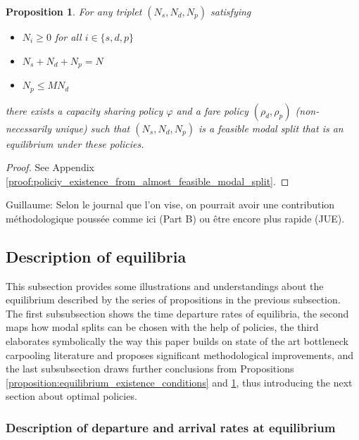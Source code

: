 \documentclass[english, a4paper]{article}
\theoremstyle{plain}
\newtheorem{proposition}{Proposition}
\theoremstyle{definition}
\theoremstyle{remark}
\begin{document}
\begin{proposition}
\label{proposition:policiy_existence_from_almost_feasible_modal_split}
    For any triplet $(N_s, N_d, N_p)$ satisfying
    \begin{itemize}
        \item $N_i \geq 0$ for all $i\in \{s, d, p\}$
        \item $N_s + N_d + N_p = N$
        \item $N_p \leq MN_d$ 
    \end{itemize}
    there exists a capacity sharing policy $\varphi$ and a fare policy $(\rho_d, \rho_p)$ (non-necessarily unique) such that $(N_s, N_d, N_p)$ is a feasible modal split that is an equilibrium under these policies.
\end{proposition}

\begin{proof}
    See Appendix \ref{proof:policiy_existence_from_almost_feasible_modal_split}.
\end{proof}

\alert{Guillaume: Selon le journal que l’on vise, on pourrait avoir une contribution méthodologique poussée comme ici (Part B) ou être encore plus rapide (JUE).}

\subsection{Description of equilibria}
\label{subsection:characteristics_of_equilibria}

This subsection provides some illustrations and understandings about the equilibrium described by the series of propositions in the previous subsection. The first subsubsection shows the time departure rates of equilibria, the second maps how modal splits can be chosen with the help of policies, the third elaborates symbolically the way this paper builds on state of the art bottleneck carpooling literature and proposes significant methodological improvements, and the last subsubsection draws further conclusions from Propositions \ref{proposition:equilibrium_existence_conditions} and \ref{proposition:policiy_existence_from_almost_feasible_modal_split}, thus introducing the next section about optimal policies.

\subsubsection{Description of departure and arrival rates at equilibrium}
\end{document}

